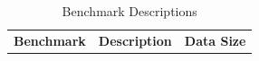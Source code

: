 \documentclass{sig-alternate}
\begin{document}
\begin{table}[htbp]
\caption{Benchmark Descriptions}
\scriptsize
\centering
\begin{tabular}{| c | c | c | }
  \hline            
  
  \multirow{2}{*}{\textbf{Benchmark}}& \multirow{2}{*}{\textbf{Description}}  & \multirow{2}{*}{\textbf{Data Size}}  \\
  &       &   \\
  
  \hline            
                                                                                     

\end{tabular}
\end{table}
\end{document}
